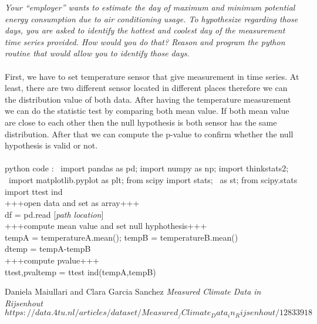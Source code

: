 \documentclass[a4paper,12pt]{article} %
\begin{document}
\begin{enumerate}
{\it Your “employer” wants to estimate the day of maximum and minimum potential energy consumption due to air conditioning usage. To hypothesize regarding those days, you are asked to identify the hottest and coolest day of the measurement time series provided. How would you do that? Reason and program the python routine that would allow you to identify those days.}
\\
\\
First, we have to set temperature sensor that give measurement in time series. At least, there are two different sensor located in different places therefore we can the distribution value of both data. After having the temperature measurement we can do the statistic test by comparing both mean value. If both mean value are close to each other then the null hypothesis is both sensor has the same distribution. After that we can compute the p-value to confirm whether the null hypothesis is valid or not. 
\\
\\python code : 
\ import pandas as pd; import numpy as np; import thinkstats2;
\ import matplotlib.pyplot as plt; {from scipy import stats}; 
\ as st; {from scipy.stats import ttest ind}
\\{+++open data and set as array+++}
\\{df = pd.read [{\it path location}]}
\\{+++compute mean value and set null hyphothesis+++}
\\tempA = temperatureA.mean(); tempB = temperatureB.mean()
\\dtemp = tempA-tempB
\\{+++compute pvalue+++}
\\ttest,pvaltemp = ttest ind(tempA,tempB)


\end{enumerate}

\begin{thebibliography}{}
Daniela Maiullari and Clara Garcia Sanchez
\textit{Measured Climate Data in Rijsenhout}
\texttt{$https://data.4tu.nl/articles/dataset/Measured_/Climate_Data_in_Rijsenhout/12833918$}
\end{thebibliography}





\end{document}
